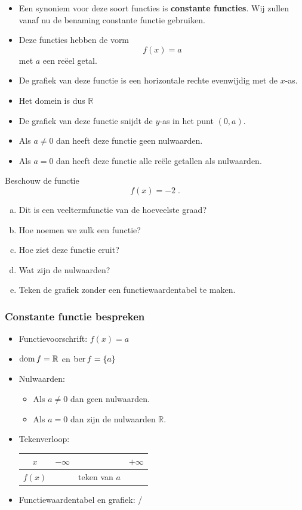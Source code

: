 \documentclass[12pt,twoside,a4paper]{article}
\begin{document}
\begin{itemize}
\item Een synoniem voor deze soort functies is {\bf constante functies}. Wij zullen vanaf nu de benaming constante functie gebruiken.
\item Deze functies hebben de vorm
  $$f(x) = a$$
  met $a$ een reëel getal.
\item De grafiek van deze functie is een horizontale rechte evenwijdig met de $x$-as.
\item Het domein is dus $\mathbb{R}$
\item De grafiek van deze functie snijdt de $y$-as in het punt $(0, a)$.
\item Als $a\neq 0$ dan heeft deze functie geen nulwaarden.
\item Als $a=0$ dan heeft deze functie alle reële getallen als nulwaarden.
\end{itemize}

\begin{oefening}
  Beschouw de functie
  $$f(x)=-2\;.$$
  \begin{enumerate}[(a)]
  \item Dit is een veeltermfunctie van de hoeveelste graad?
  \item Hoe noemen we zulk een functie?
  \item Hoe ziet deze functie eruit?
  \item Wat zijn de nulwaarden?
  \item Teken de grafiek zonder een functiewaardentabel te maken.
  \end{enumerate}
\end{oefening}

\subsubsection*{Constante functie bespreken}
\begin{mdframed}
  \begin{itemize}
  \item Functievoorschrift: $f(x)=a$
  \item $\dom f = \mathbb{R}$ en $\ber f = \{a\}$
  \item Nulwaarden:
    \begin{itemize}
    \item Als $a\neq 0$ dan geen nulwaarden.
    \item Als $a=0$ dan zijn de nulwaarden $\mathbb{R}$.
    \end{itemize}
  \item Tekenverloop:
    \begin{center}
      \begin{tabular}{c|lcr}
        $x$ & $-\infty$ & & $+\infty$\\
        \hline
        $f(x)$ & & teken van $a$ &
      \end{tabular}
    \end{center}
  \item Functiewaardentabel en grafiek: /
  \end{itemize}
\end{mdframed}
\end{document}
